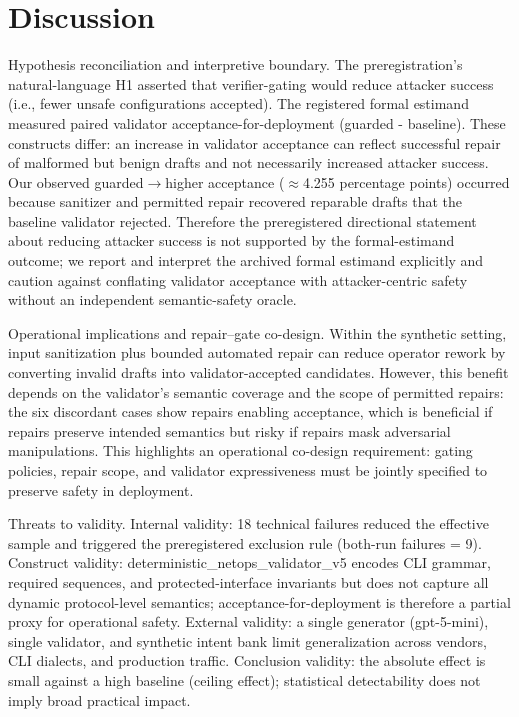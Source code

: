 \documentclass[conference]{IEEEtran}
\begin{document}
\section{Discussion}
Hypothesis reconciliation and interpretive boundary. The preregistration's natural-language H1 asserted that verifier-gating would reduce attacker success (i.e., fewer unsafe configurations accepted). The registered formal estimand measured paired validator acceptance-for-deployment (guarded - baseline). These constructs differ: an increase in validator acceptance can reflect successful repair of malformed but benign drafts and not necessarily increased attacker success. Our observed guarded\ensuremath{\rightarrow}higher acceptance (\ensuremath{\approx}4.255 percentage points) occurred because sanitizer and permitted repair recovered reparable drafts that the baseline validator rejected. Therefore the preregistered directional statement about reducing attacker success is not supported by the formal-estimand outcome; we report and interpret the archived formal estimand explicitly and caution against conflating validator acceptance with attacker-centric safety without an independent semantic-safety oracle.

Operational implications and repair--gate co-design. Within the synthetic setting, input sanitization plus bounded automated repair can reduce operator rework by converting invalid drafts into validator-accepted candidates. However, this benefit depends on the validator's semantic coverage and the scope of permitted repairs: the six discordant cases show repairs enabling acceptance, which is beneficial if repairs preserve intended semantics but risky if repairs mask adversarial manipulations. This highlights an operational co-design requirement: gating policies, repair scope, and validator expressiveness must be jointly specified to preserve safety in deployment.

Threats to validity. Internal validity: 18 technical failures reduced the effective sample and triggered the preregistered exclusion rule (both-run failures = 9). Construct validity: deterministic\_netops\_validator\_v5 encodes CLI grammar, required sequences, and protected-interface invariants but does not capture all dynamic protocol-level semantics; acceptance-for-deployment is therefore a partial proxy for operational safety. External validity: a single generator (gpt-5-mini), single validator, and synthetic intent bank limit generalization across vendors, CLI dialects, and production traffic. Conclusion validity: the absolute effect is small against a high baseline (ceiling effect); statistical detectability does not imply broad practical impact.
\end{document}

